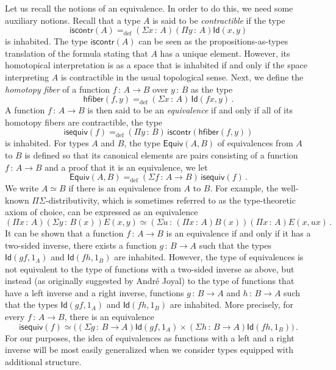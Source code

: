 \documentclass[10pt,a4paper,oneside,reqno]{amsart}
\numberwithin{equation}{section}
\theoremstyle{mythm}
\theoremstyle{mydef}
\theoremstyle{myrmk}
\newcommand{\ie}{\text{i.e.\ }}
\newcommand{\defeq}{=_{\mathrm{def}}}
\newcommand{\co}{\,{:}\,}
\newcommand{\hfiber}{\mathsf{hfiber}}
\newcommand{\iscontr}{\mathsf{iscontr}}
\newcommand{\isequiv}{\mathsf{isequiv}}
\newcommand{\Eq}{\mathsf{Equiv}}
\newcommand{\Id}{\mathsf{Id}}
\begin{document}
Let us recall the notions of an equivalence. In order to do this, we need some auxiliary notions. Recall that a type $A$ is said to be \emph{contractible} if the  type 
 \begin{equation}
 \label{eq:contractible}
\iscontr(A) \defeq (\Sigma x\co A) (\Pi y\co A) \Id(x,y)
\end{equation}
is inhabited. The type $\iscontr(A)$ can be seen as the propositions-as-types translation
of the formula stating that $A$ has a unique element. However, its homotopical interpretation 
is as a space that is inhabited if and only if the space interpreting $A$ is contractible in the usual
topological sense. Next, we define the \emph{homotopy fiber} of a function $f \co A \to B$ over $y \co B$ as the type
\[
 \hfiber(f,y) \defeq (\Sigma x \co A)\, \Id(f x, y) \, .
\]
A function $f \co A \to B$ is then  said to be an \emph{equivalence} if and only if all of its homotopy fibers are contractible, \ie the type
\[
\isequiv(f) \defeq (\Pi y \co B) \, \iscontr(\hfiber(f,y)) 
\]
is inhabited.  For types $A$ and $B$, the type $\Eq(A,B)$ of equivalences from $A$ to $B$ is  defined so that its canonical elements are pairs consisting of a function $f \co A \to B$ and a proof that it is an equivalence, \ie we let 
 \begin{equation}
 \label{equ:weq}
 \Eq(A,B) \defeq (\Sigma f \co A \to B) \, \isequiv(f) \, .
 \end{equation}
 We write $A\simeq B$ if there is an equivalence from $A$ to $B$. For example, the well-known $\Pi\Sigma$-distributivity, which is sometimes referred to as the type-theoretic axiom of choice, can be expressed as an equivalence 
 \begin{equation}
 \label{equ:ac}
 (\Pi x \co A)(\Sigma y \co B(x)) E(x,y) \simeq 
 (\Sigma u  \co (\Pi x \co A)B(x)) (\Pi x \co A) E(x, ux) \, .
 \end{equation}
 It can be shown that a function $f \co A \rightarrow B$ is an equivalence if and only if it has a two-sided inverse,
 \ie there exists a function $g \co B \to A$ such that the types $\Id(gf, 1_A)$
 and $\Id(fh, 1_B)$ are inhabited. However, the type of equivalences is not equivalent to
 the type of functions with a two-sided inverse as above, but instead (as originally suggested by Andr\'e Joyal) 
to the type of functions that have a left inverse and a right inverse, \ie functions
$g \co B \to A$ and $h \co B \to A$ such that the  types $ \Id(g  f, 1_A)$ and $\Id(f h, 1_B)$ are inhabited. 
More precisely, for every $f \co A \to B$, there is an equivalence
\[
\isequiv(f) \simeq 
 \big( 
 (\Sigma g \co B \to A) \Id(gf, 1_A) \times (\Sigma h \co B \to A) \Id(fh, 1_B) 
 \big) \, .
 \]
For our purposes, the idea of equivalences as functions with a left and a right inverse will be most
easily generalized when we consider types equipped with additional structure.
\end{document}
